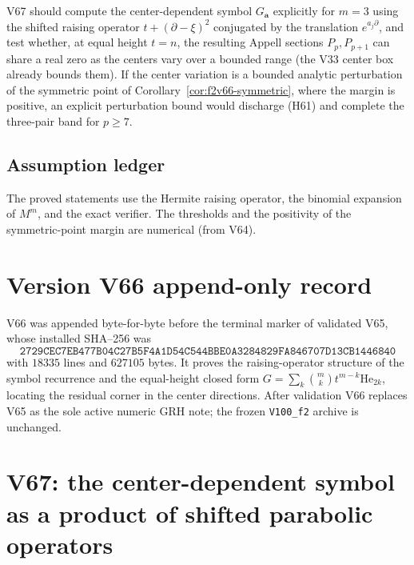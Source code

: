 \documentclass[11pt]{article}
\theoremstyle{definition}
\theoremstyle{remark}
\begin{document}
V67 should compute the center-dependent symbol
\(G_{\bm a}\) explicitly for \(m=3\) using the shifted raising operator
\(t+(\partial-\xi)^2\) conjugated by the translation \(e^{a_j\partial}\),
and test whether, at equal height \(t=n\), the resulting Appell sections
\(P_p,P_{p+1}\) can share a real zero as the centers vary over a bounded
range (the V33 center box already bounds them).  If the center variation
is a bounded analytic perturbation of the symmetric point of
Corollary~\ref{cor:f2v66-symmetric}, where the margin is positive, an
explicit perturbation bound would discharge (H61) and complete the
three-pair band for \(p\ge7\).

\subsection*{Assumption ledger}
\label{ass:f2v66}
The proved statements use the Hermite raising operator, the binomial
expansion of \(M^m\), and the exact verifier.  The thresholds and the
positivity of the symmetric-point margin are numerical (from V64).
\endgroup

\section*{Version V66 append-only record}

V66 was appended byte-for-byte before the terminal marker of validated
V65, whose installed SHA--256 was
\[
 \texttt{2729CEC7EB477B04C27B5F4A1D54C544}
 \allowbreak\texttt{BBE0A3284829FA846707D13CB1446840}
\]
with \(18335\) lines and \(627105\) bytes.  It proves the raising-operator
structure of the symbol recurrence and the equal-height closed form
\(G=\sum_k\binom mk t^{m-k}\mathrm{He}_{2k}\), locating the residual
corner in the center directions.  After validation V66 replaces V65 as
the sole active numeric GRH note; the frozen \texttt{V100\_f2} archive is
unchanged.





\clearpage
\section{V67: the center-dependent symbol as a product of shifted parabolic operators}
\label{sec:f2v67-center-symbol}
\begingroup
\setcounter{equation}{0}
\renewcommand{\theequation}{N67.\arabic{equation}}
\renewcommand{\theHequation}{f2v67.\arabic{equation}}
\end{document}

